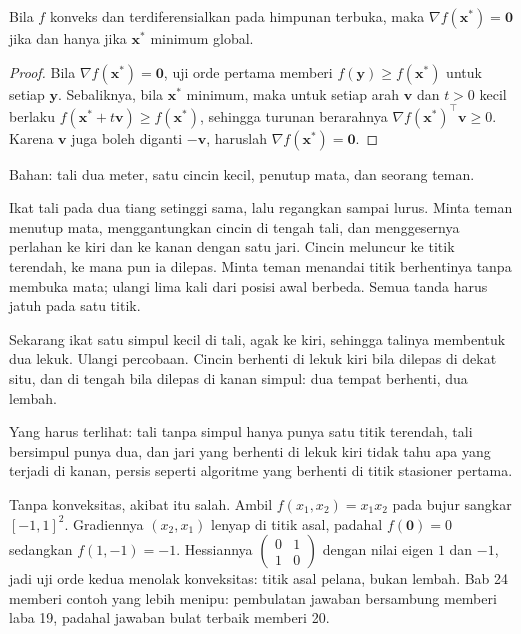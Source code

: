 \begin{akibat}
Bila $f$ konveks dan terdiferensialkan pada himpunan terbuka, maka
$\nabla f(\mathbf{x}^{*})=\mathbf{0}$ jika dan hanya jika $\mathbf{x}^{*}$ minimum
global.
\end{akibat}

\begin{proof}
Bila $\nabla f(\mathbf{x}^{*})=\mathbf{0}$, uji orde pertama memberi
$f(\mathbf{y})\ge f(\mathbf{x}^{*})$ untuk setiap $\mathbf{y}$. Sebaliknya, bila
$\mathbf{x}^{*}$ minimum, maka untuk setiap arah $\mathbf{v}$ dan $t>0$ kecil berlaku
$f(\mathbf{x}^{*}+t\mathbf{v})\ge f(\mathbf{x}^{*})$, sehingga turunan berarahnya
$\nabla f(\mathbf{x}^{*})^{\top}\mathbf{v}\ge0$. Karena $\mathbf{v}$ juga boleh diganti
$-\mathbf{v}$, haruslah $\nabla f(\mathbf{x}^{*})=\mathbf{0}$.
\end{proof}

\begin{tangan}
Bahan: tali dua meter, satu cincin kecil, penutup mata, dan seorang teman.

Ikat tali pada dua tiang setinggi sama, lalu regangkan sampai lurus. Minta teman menutup
mata, menggantungkan cincin di tengah tali, dan menggesernya perlahan ke kiri dan ke
kanan dengan satu jari. Cincin meluncur ke titik terendah, ke mana pun ia dilepas. Minta
teman menandai titik berhentinya tanpa membuka mata; ulangi lima kali dari posisi awal
berbeda. Semua tanda harus jatuh pada satu titik.

Sekarang ikat satu simpul kecil di tali, agak ke kiri, sehingga talinya membentuk dua
lekuk. Ulangi percobaan. Cincin berhenti di lekuk kiri bila dilepas di dekat situ, dan
di tengah bila dilepas di kanan simpul: dua tempat berhenti, dua lembah.

Yang harus terlihat: tali tanpa simpul hanya punya satu titik terendah, tali bersimpul
punya dua, dan jari yang berhenti di lekuk kiri tidak tahu apa yang terjadi di kanan,
persis seperti algoritme yang berhenti di titik stasioner pertama.
\end{tangan}

Tanpa konveksitas, akibat itu salah. Ambil $f(x_{1},x_{2})=x_{1}x_{2}$ pada bujur
sangkar $[-1,1]^{2}$. Gradiennya $(x_{2},x_{1})$ lenyap di titik asal, padahal
$f(\mathbf{0})=0$ sedangkan $f(1,-1)=-1$. Hessiannya
$\begin{pmatrix}0&1\\1&0\end{pmatrix}$ dengan nilai eigen $1$ dan $-1$, jadi uji orde
kedua menolak konveksitas: titik asal pelana, bukan lembah. Bab 24 memberi contoh yang
lebih menipu: pembulatan jawaban bersambung memberi laba 19, padahal jawaban bulat
terbaik memberi 20.

